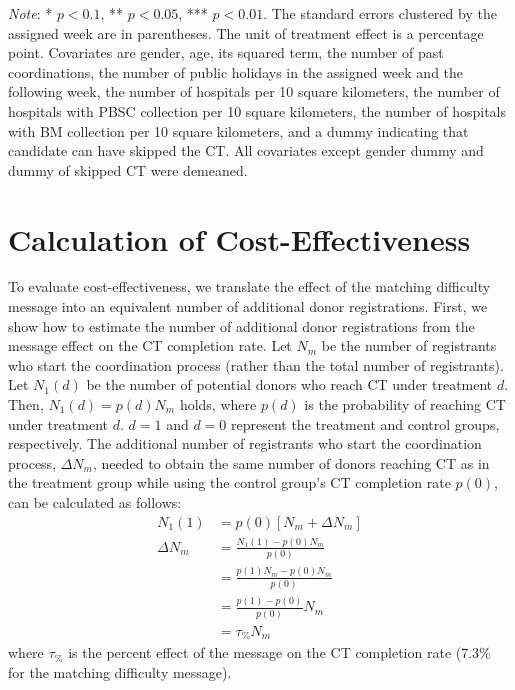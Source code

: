 \documentclass[12pt, a4paper]{article}
\begin{document}
\begin{landscape}
\begin{table}[H]
\begin{threeparttable}
\begin{tabular}[t]{lccccccccc}
\bottomrule
\end{tabular}
\begin{tablenotes}
\item \emph{Note}: * $p < 0.1$, ** $p < 0.05$, *** $p < 0.01$. The standard errors clustered by the assigned week are in parentheses. The unit of treatment effect is a percentage point. Covariates are gender, age, its squared term, the number of past coordinations, the number of public holidays in the assigned week and the following week, the number of hospitals per 10 square kilometers, the number of hospitals with PBSC collection per 10 square kilometers, the number of hospitals with BM collection per 10 square kilometers, and a dummy indicating that candidate can have skipped the CT. All covariates except gender dummy and dummy of skipped CT were demeaned.
\end{tablenotes}
\end{threeparttable}
\end{table}
\end{landscape}

\section{Calculation of Cost-Effectiveness}\label{calculation-of-cost-effectiveness}

To evaluate cost-effectiveness, we translate the effect of the matching difficulty message into an equivalent number of additional donor registrations. First, we show how to estimate the number of additional donor registrations from the message effect on the CT completion rate. Let \(N_m\) be the number of registrants who start the coordination process (rather than the total number of registrants). Let \(N_1(d)\) be the number of potential donors who reach CT under treatment \(d\). Then, \(N_1(d) = p(d)N_m\) holds, where \(p(d)\) is the probability of reaching CT under treatment \(d\). \(d = 1\) and \(d = 0\) represent the treatment and control groups, respectively. The additional number of registrants who start the coordination process, \(\Delta N_m\), needed to obtain the same number of donors reaching CT as in the treatment group while using the control group's CT completion rate \(p(0)\), can be calculated as follows:
\begin{equation*}
\begin{split}
  N_1(1) &= p(0)[N_m + \Delta N_m] \\
  \Delta N_m &= \frac{N_1(1) - p(0)N_m}{p(0)} \\
  &= \frac{p(1)N_m - p(0)N_m}{p(0)} \\
  &= \frac{p(1) - p(0)}{p(0)}N_m \\
  &= \tau_{\%} N_m
\end{split}
\end{equation*}
where \(\tau_{\%}\) is the percent effect of the message on the CT completion rate (7.3\% for the matching difficulty message).
\end{document}
